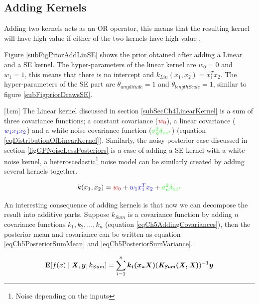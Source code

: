 \subsection{Adding Kernels} \label{subsecStructureKernelsAddingKernels}
Adding two kernels acts as an OR operator, this means that the resulting kernel will have high value if either of the two kernels have high value \cite{durrande2011additive}. 

Figure \ref{subFigPriorAddLinSE} shows the prior obtained after adding a Linear and a SE kernel. The hyper-parameters of the linear kernel are $w_{0}=0$ and $w_{1}=1$, this means that there is no intercept and $k_{Lin}(x_{1}, x_{2}) = x_{1}^Tx_{2}$. The hyper-parameters of the SE part are $\theta_{amplitude}=1$ and $\theta_{lengthScale}=1$, similar to figure \ref{subFigpriorDrawsSE}. 

[1cm]
The Linear kernel discussed in section \ref{subSecCh4LinearKernel} is a sum of three covariance functions; a constant covariance ($\textcolor{red}{w_{0}}$), a linear covariance ($\textcolor{blue}{w_{1}x_{1}x_{2}}$) and a white noise covariance function ($\textcolor{green}{\sigma_{n}^2\delta_{xx'}}$) (equation \ref{eqDistributionOfLinearKernel}). Similarly, the noisy posterior case discussed in section \ref{figGPNoiseLessPosteriors} is a case of adding a SE kernel with a white noise kernel, a heteroscedastic\footnote{Noise depending on the inputs} noise model can be similarly created by adding several kernels together.

\begin{equation}\label{eqDistributionOfLinearKernel}
k(x_{1}, x_{2}) = \textcolor{red}{w_{0}} + \textcolor{blue}{w_{1} x_{1}^T x_{2}} + \textcolor{green}{\sigma_{n}^2\delta_{xx'}}
\end{equation}

An interesting consequence of adding kernels is that now we can decompose the result into additive parts. Suppose $k_{Sum}$ is a covariance function by adding $n$ covariance functions $k_{1}, k_{2}, \ldots, k_{n}$ (equation \ref{eqCh5AddingCovariances}), then the posterior mean and covariance can be written as equation \ref{eqCh5PosteriorSumMean} and \ref{eqCh5PosteriorSumVariance}. 

\begin{align}\label{eqCh5PosteriorSumMean}
\mathbf{E}[f(x) \mid \bm{\mathit{X}}, \boldsymbol{y}, k_{Sum}] = \sum_{i=1}^{n} \boldsymbol{k_{i}(x_{*}X)}( \bm{\mathit{K_{Sum}(X, X)}})^{-1} \boldsymbol{y}
\end{align}


